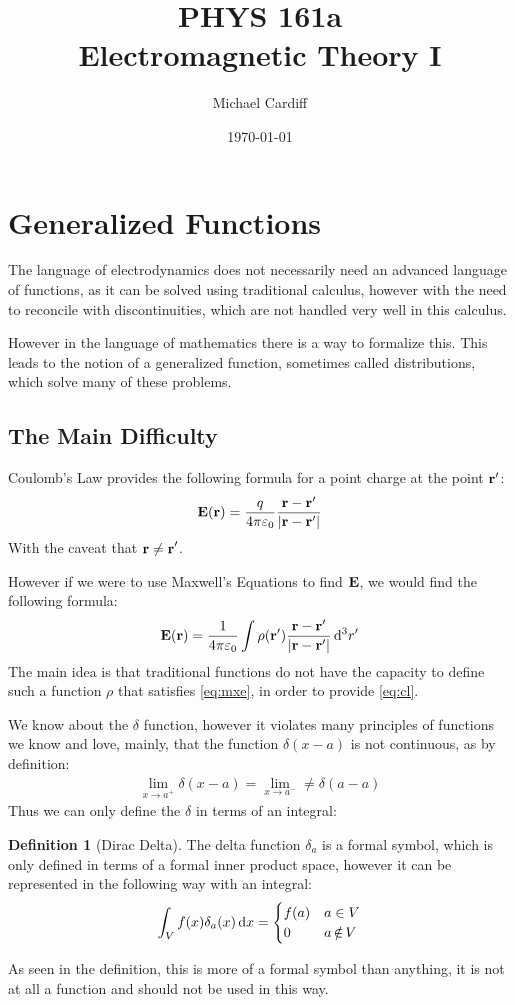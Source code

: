 \documentclass[12pt]{article}
\title{\vspace{-3em}PHYS 161a\\Electromagnetic Theory I}
\author{Michael Cardiff}
\date{\today}
\theoremstyle{plain}
\theoremstyle{definition}
\newtheorem{definition}{Definition}[section]
\newcommand{\veps}{\varepsilon}
\begin{document}
\maketitle
\section{Generalized Functions}
The language of electrodynamics does not necessarily need an advanced language of functions, as it can be solved using traditional calculus, however with the need to reconcile with discontinuities, which are not handled very well in this calculus.

However in the language of mathematics there is a way to formalize this. This leads to the notion of a generalized function, sometimes called distributions, which solve many of these problems.

\subsection{The Main Difficulty}
Coulomb's Law provides the following formula for a point charge at the point $\vb{r}'$:
\begin{equation}
  \label{eq:cl}
  \vb{E}(\vb{r})=\frac{q}{4\pi\veps_0}\frac{\vb{r-r}'}{\abs{\vb{r-r}'}}
\end{equation}
With the caveat that $\vb{r\neq r}'$.

However if we were to use Maxwell's Equations to find $\vb{E}$, we would find the following formula:
\begin{equation}
  \label{eq:mxe}
  \vb{E}(\vb{r})=\frac1{4\pi\veps_0}\int
  \rho(\vb{r}')\frac{\vb{r-r}'}{\abs{\vb{r-r}'}}\dd[3]{r'}
\end{equation}
The main idea is that traditional functions do not have the capacity to define such a function $\rho$ that satisfies \eqref{eq:mxe}, in order to provide \eqref{eq:cl}.

We know about the $\delta$ function, however it violates many principles of functions we know and love, mainly, that the function $\delta(x-a)$ is not continuous, as by definition:
\begin{align*}
  \lim_{x\to a^+}\delta(x-a)=\lim_{x\to a^-}\neq\delta(a-a)
\end{align*}
Thus we can only define the $\delta$ in terms of an integral:
\begin{definition}[Dirac Delta]
  The delta function $\delta_a$ is a formal symbol, which is only defined in terms of a formal inner product space, however it can be represented in the following way with an integral:
  \begin{equation}
    \label{eq:delta}
    \int_Vf(x)\delta_a(x)\dd{x}=
    \begin{cases}
      f(a) & a\in V\\
      0    & a\,\slashed{\in}\,V
    \end{cases}
  \end{equation}
\end{definition}
As seen in the definition, this is more of a formal symbol than anything, it is not at all a function and should not be used in this way.
\end{document}
